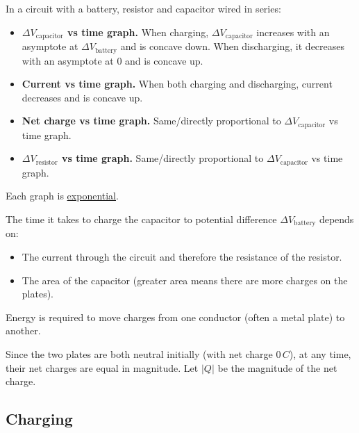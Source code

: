 \documentclass{article}
\begin{document}
In a circuit with a battery, resistor and capacitor wired in series:
\begin{itemize}
	\item \textbf{$\Delta V_\text{capacitor}$ vs time graph.} When charging, $\Delta V_\text{capacitor}$ increases with an asymptote at $\Delta V_\text{battery}$ and is concave down. When discharging, it decreases with an asymptote at $0$ and is concave up.

	\item \textbf{Current vs time graph.} When both charging and discharging, current decreases and is concave up.

	\item \textbf{Net charge vs time graph.} Same/directly proportional to $\Delta V_\text{capacitor}$ vs time graph.

	\item \textbf{$\Delta V_\text{resistor}$ vs time graph.} Same/directly proportional to $\Delta V_\text{capacitor}$ vs time graph.
\end{itemize}
Each graph is \ul{exponential}.

The time it takes to charge the capacitor to potential difference $\Delta V_\text{battery}$ depends on:
\begin{itemize}
	\item The current through the circuit and therefore the resistance of the resistor.
	\item The area of the capacitor (greater area means there are more charges on the plates).
\end{itemize}

Energy is required to move charges from one conductor (often a metal plate) to another.

Since the two plates are both neutral initially (with net charge $0\,\si{C}$), at any time, their net charges are equal in magnitude. Let $\left|Q\right|$ be the magnitude of the net charge.

\subsection{Charging}
\end{document}
